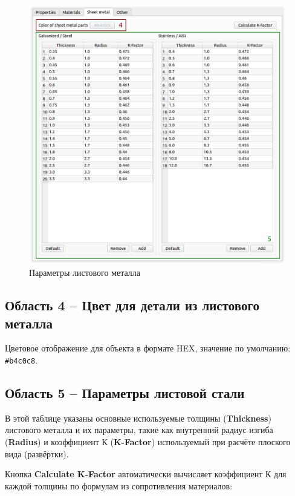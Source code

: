 \documentclass[a4paper,12pt]{article}
\begin{document}
\begin{figure}[htp]
	\centering
	\includegraphics[width=1\textwidth]{img/pref_sm.png}
	\caption{Параметры листового металла}
	\label{sec:pref_sm}
\end{figure}

\subsection{Область 4 -- Цвет для детали из листового металла}
Цветовое отображение для объекта в формате HEX, значение по умолчанию: \verb|#b4c0c8|.

\subsection{Область 5 -- Параметры листовой стали}
В этой таблице указаны основные используемые толщины (\textbf{Thickness}) листового металла и их параметры, такие как внутренний радиус изгиба (\textbf{Radius}) и коэффициент К (\textbf{K-Factor}) используемый при расчёте плоского вида (развёртки).\\

\pagebreak


Кнопка \textbf{Calculate K-Factor} автоматически вычисляет коэффициент К для каждой толщины по формулам из сопротивления материалов:
\end{document}
